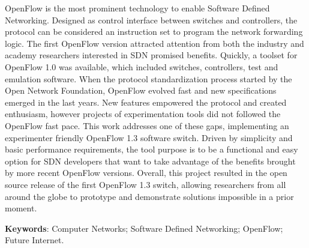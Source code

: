\begin{resumo}
    OpenFlow is the most prominent technology to enable Software Defined Networking. Designed as control interface between switches and controllers, the protocol can be considered an instruction set to program the network forwarding logic. The first OpenFlow version attracted attention from both the industry and academy researchers interested in SDN promised benefits. Quickly, a toolset for OpenFlow 1.0 was available, which included switches, controllers, test and emulation software. When the protocol standardization process started by the Open Network Foundation, OpenFlow evolved fast and new specifications emerged in the last years. New features empowered the protocol and created enthusiasm, however projects of experimentation tools did not followed the OpenFlow fast pace. This work addresses one of these gaps, implementing an experimenter friendly OpenFlow 1.3 software switch. Driven by simplicity and basic performance requirements, the tool purpose is to be a functional and easy option for SDN developers that want to take advantage of the benefits brought by more recent OpenFlow versions. Overall, this project resulted in the open source release of the first OpenFlow 1.3 switch, allowing researchers from all around the globe to prototype and demonstrate solutions impossible in a prior moment. 
    \vspace{\onelineskip}


    \noindent\textbf{Keywords}: Computer Networks; Software Defined Networking; OpenFlow; Future Internet.

    \pagebreak


\end{resumo}
